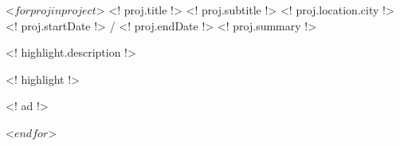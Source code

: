 \begin{cventries}
 <$ for proj in project $>
  \cventry
    {<! proj.title !>}
    {<! proj.subtitle !>}
    {<! proj.location.city !>}
    {<! proj.startDate !> / <! proj.endDate !>}
    {<! proj.summary !>}
    {
          \begin{cvitems}
                    \item{<! highlight.description !>}
                    \item{<! highlight !>}
                    \begin{cvitemssub}
                        \item{<! ad !>}
                    \end{cvitemssub}
          \end{cvitems}
    }
 <$ endfor $>
\end{cventries}

